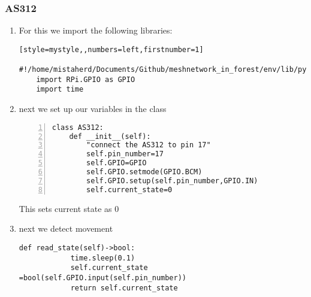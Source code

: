 \subsubsection{AS312}
\begin{enumerate}

\item For this we import the following libraries:

\begin{lstlisting}[style=mystyle,,numbers=left,firstnumber=1]
    #!/home/mistaherd/Documents/Github/meshnetwork_in_forest/env/lib/python3.11
    import RPi.GPIO as GPIO
    import time
\end{lstlisting}

    \item next  we set up our variables  in the class

    \begin{lstlisting}[style=mystyle,numbers=left,firstnumber=1]
    class AS312:
	def __init__(self):
		"connect the AS312 to pin 17"
		self.pin_number=17
		self.GPIO=GPIO
		self.GPIO.setmode(GPIO.BCM)
		self.GPIO.setup(self.pin_number,GPIO.IN)
		self.current_state=0
    \end{lstlisting}
    This sets current state as 0
    \item next  we detect  movement
    \begin{lstlisting}[style=mystyle]
        def read_state(self)->bool:
            time.sleep(0.1)
            self.current_state =bool(self.GPIO.input(self.pin_number))
            return self.current_state
    \end{lstlisting}

\end{enumerate}

